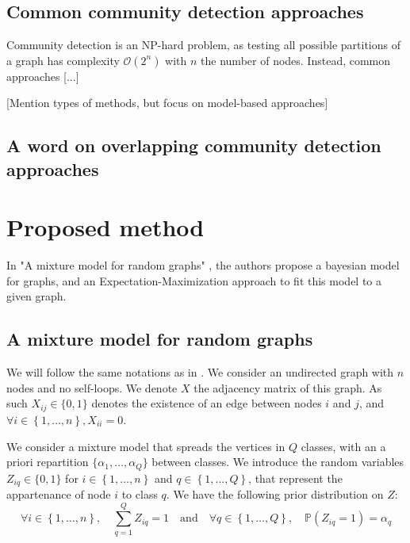 \documentclass[11pt]{article}
\renewcommand{\O}{\mathcal{O}}
\begin{document}
\subsection{Common community detection approaches}

Community detection is an NP-hard problem, as testing all possible partitions of a graph has complexity $\O(2^n)$ with $n$ the number of nodes. Instead, common approaches [...]

    [Mention types of methods, but focus on model-based approaches]

\subsection{A word on overlapping community detection approaches}




\section{Proposed method}

In "A mixture model for random graphs" \cite{main_article}, the authors propose a bayesian model for graphs, and an Expectation-Maximization approach to fit this model to a given graph.

\subsection{A mixture model for random graphs}

We will follow the same notations as in \cite{main_article}. We consider an undirected graph with $n$ nodes and no self-loops. We denote $X$ the adjacency matrix of this graph. As such $X_{ij}\in \{0,1\}$ denotes the existence of an edge between nodes $i$ and $j$, and $\forall i\in \left\{1,\dots,n\right\}, X_{ii}=0$.

We consider a mixture model that spreads the vertices in $Q$ classes, with an a priori repartition $\{\alpha_1, \dots, \alpha_Q\}$ between classes. We introduce the random variables $Z_{iq} \in \{0,1\}$ for $i\in \left\{1,\dots,n\right\}$ and $q\in \left\{1,\dots,Q\right\}$, that represent the appartenance of node $i$ to class $q$. We have the following prior distribution on $Z$:
\begin{equation}
    \forall i\in \left\{1,\dots,n\right\}, \quad \sum_{q=1}^Q Z_{iq} = 1 \quad \text{and} \quad \forall q\in \left\{1,\dots,Q\right\},\quad \mathbb{P}(Z_{iq}=1)=\alpha_q
\end{equation}
\end{document}
